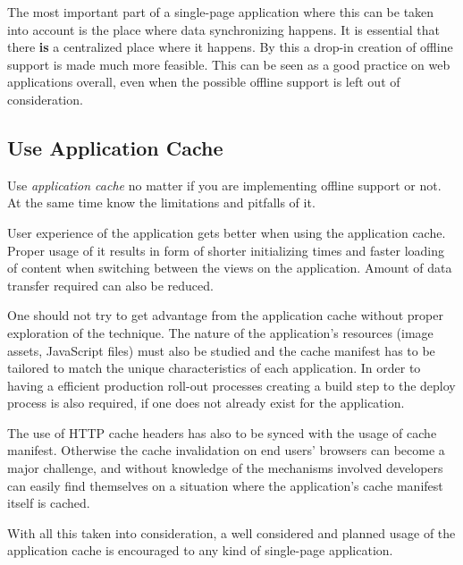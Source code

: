 The most important part of a single-page application where this can be taken into account is the place where data synchronizing happens. It is essential that there \textbf{is} a centralized place where it happens. By this a drop-in creation of offline support is made much more feasible. This can be seen as a good practice on web applications overall, even when the possible offline support is left out of consideration. 






\subsection{Use Application Cache}


Use \textit{application cache} no matter if you are implementing offline support or not. At the same time know the limitations and pitfalls of it.

User experience of the application gets better when using the application cache. Proper usage of it results in form of shorter initializing times and faster loading of content when switching between the views on the application. Amount of data transfer required can also be reduced. 

One should not try to get advantage from the application cache without proper exploration of the technique. The nature of the application's resources (image assets, JavaScript files) must also be studied and the cache manifest has to be tailored to match the unique characteristics of each application. In order to having a efficient production roll-out processes creating a build step to the deploy process is also required, if one does not already exist for the application.

The use of HTTP cache headers has also to be synced with the usage of cache manifest. Otherwise the cache invalidation on end users' browsers can become a major challenge, and without knowledge of the mechanisms involved developers can easily find themselves on a situation where the application's cache manifest itself is cached. 

With all this taken into consideration, a well considered and planned usage of the application cache is encouraged to any kind of single-page application.








